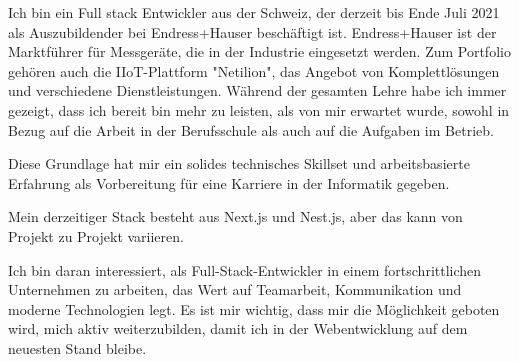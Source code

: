 \documentclass[9pt]{developercv} %
\begin{document}
\vspace{0.5cm}



\begin{minipage}[t]{0.48\textwidth} %
	\vspace{-\baselineskip} %
	
  Ich bin ein Full stack Entwickler aus der Schweiz, der derzeit bis Ende Juli 2021 als Auszubildender bei Endress+Hauser beschäftigt ist. Endress+Hauser ist der Marktführer für Messgeräte, die in der Industrie eingesetzt werden. Zum Portfolio gehören auch die IIoT-Plattform "Netilion", das Angebot von Komplettlösungen und verschiedene Dienstleistungen. Während der gesamten Lehre habe ich immer gezeigt, dass ich bereit bin mehr zu leisten, als von mir erwartet wurde, sowohl in Bezug auf die Arbeit in der Berufsschule als auch auf die Aufgaben im Betrieb.
\end{minipage}
\hfill %
\begin{minipage}[t]{0.48\textwidth} %
	\vspace{-\baselineskip} %
  Diese Grundlage hat mir ein solides technisches Skillset und arbeitsbasierte Erfahrung als Vorbereitung für eine Karriere in der Informatik gegeben.

Mein derzeitiger Stack besteht aus Next.js und Nest.js, aber das kann von Projekt zu Projekt variieren.

Ich bin daran interessiert, als Full-Stack-Entwickler in einem fortschrittlichen Unternehmen zu arbeiten, das Wert auf Teamarbeit, Kommunikation und moderne Technologien legt. Es ist mir wichtig, dass mir die Möglichkeit geboten wird, mich aktiv weiterzubilden, damit ich in der Webentwicklung auf dem neuesten Stand bleibe.
\end{minipage}


\end{document}
